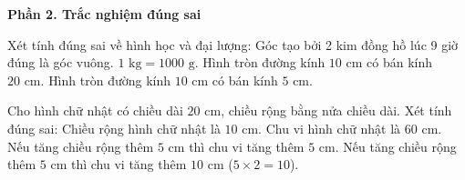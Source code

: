 \textbf{Phần 2. Trắc nghiệm đúng sai}

\begin{ex} %
Xét tính đúng sai về hình học và đại lượng:
\choiceTF
{\True Góc tạo bởi 2 kim đồng hồ lúc 9 giờ đúng là góc vuông.}
{\True $1\text{ kg} = 1000\text{ g}$.}
{Hình tròn đường kính $10\text{ cm}$ có bán kính $20\text{ cm}$.}
{\True Hình tròn đường kính $10\text{ cm}$ có bán kính $5\text{ cm}$.}
\end{ex}

\begin{ex} %
Cho hình chữ nhật có chiều dài $20\text{ cm}$, chiều rộng bằng nửa chiều dài. Xét tính đúng sai:
\choiceTF
{\True Chiều rộng hình chữ nhật là $10\text{ cm}$.}
{\True Chu vi hình chữ nhật là $60\text{ cm}$.}
{Nếu tăng chiều rộng thêm $5\text{ cm}$ thì chu vi tăng thêm $5\text{ cm}$.}
{\True Nếu tăng chiều rộng thêm $5\text{ cm}$ thì chu vi tăng thêm $10\text{ cm}$ ($5 \times 2 = 10$).}
\end{ex}


